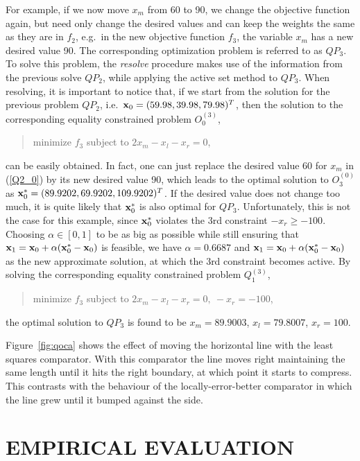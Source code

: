 \documentclass{uist96}
\begin{document}
For example, if we now move $x_m$ from 60 to 90,
we change the objective function again, but need only change the 
desired values and can keep the weights the same as they are in $f_2$,
e.g.\ in the new objective function $f_3$, the variable $x_m$ has 
a new desired value 90. The corresponding optimization problem
is referred to as $QP_3$\@. To solve this problem, the {\em resolve}
procedure makes use of the information from the
previous solve $QP_2$, while applying the active set method to $QP_3$\@. 
When resolving, it is important to notice that, if we start from 
the solution for the previous problem $QP_2$, i.e.\ ${\bf x}_0 = (59.98,
39.98,79.98)^T$, then the solution to the corresponding equality
constrained problem $O^{(3)}_0$,
\begin{quote}
minimize $f_3 $ subject to $2x_m -x_l -x_r = 0$,
\end{quote}
can be easily obtained. In fact, one can just replace the desired
value 60 for $x_m$ in (\ref{Q2_0}) by its new desired value 90, which 
leads to the optimal solution to $O^{(0)}_3$ as 
${\bf x}^\ast_0 = (89.9202, 69.9202,109.9202)^T$\@. If the desired value 
does not change too much, it is quite likely that ${\bf x}^\ast_0$ is also 
optimal for $QP_3$\@. Unfortunately, this is not the case for this example,
since ${\bf x}^\ast_0$ violates the 3rd constraint $-x_r \geq -100$\@.
Choosing $\alpha \in [ 0, 1]$ to be as big as possible while still ensuring
that
${\bf x}_1 = {\bf x}_0 + \alpha({\bf x}^\ast_0 - {\bf x}_0)$ is feasible, 
we have $\alpha = 0.6687$
and ${\bf x}_1 = {\bf x}_0 + \alpha({\bf x}^\ast_0 - {\bf x}_0)$ as the new approximate 
solution, at which the 3rd constraint becomes active. By
solving the corresponding
equality constrained problem $Q^{(3)}_1$,
\begin{quote}
minimize $f_3 $ subject to $2x_m - x_l -x_r = 0, 
\ -x_r = -100 $,
\end{quote}
the optimal solution to $QP_3$ is found to be 
$x_m = 89.9003$, $x_l = 79.8007$,
$x_r = 100$. 

Figure~\ref{fig:qoca} shows the effect of moving the horizontal line
with the least squares comparator. With this comparator the line
moves right maintaining the same length until it hits the right boundary,
at which point it starts to compress. This contrasts with the behaviour
of the locally-error-better comparator
in which the line grew until it bumped against the side.


\section{EMPIRICAL EVALUATION}
\label{empirical-evaluation}
\end{document}
